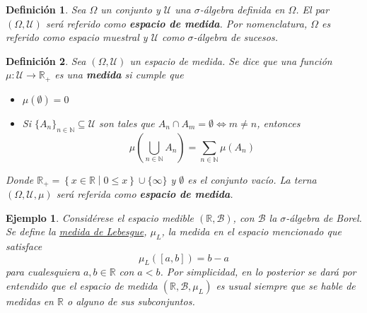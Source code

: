 \documentclass[12pt,letterpaper]{book}
\newtheorem{definicion}{Definición}[chapter]
\newtheorem{ejemplo}{Ejemplo}[chapter]
\newcommand{\R}{\mathbb{R}}
\newcommand{\talque}{\mathrel{}\middle|\mathrel{}}
\begin{document}
\begin{definicion}
Sea $\Omega$ un conjunto y $\mathcal{U}$ una $\sigma$-álgebra definida en $\Omega$. El par $(\Omega,\mathcal{U})$ será referido como \textbf{espacio de medida}. Por nomenclatura, $\Omega$ es referido como \textit{espacio muestral} y $\mathcal{U}$ como \textit{$\sigma$-álgebra de sucesos}.
\end{definicion}

\begin{definicion}%
Sea $(\Omega, \mathcal{U})$ un espacio de medida. Se dice que una función $\mu : \mathcal{U} \rightarrow \R_+$ es una \textbf{medida} si cumple que
\begin{itemize}
\item $\mu(\emptyset) = 0$
\item Si $\{ A_n \}_{n\in \mathbb{N}} \subseteq \mathcal{U}$ son tales que $A_n \cap A_m = \emptyset \Leftrightarrow m\neq n$, entonces 
\begin{equation}
\mu\left( \bigcup_{n\in \mathbb{N}} A_n \right) = \sum_{n\in \mathbb{N}} \mu(A_n)
\end{equation}
\end{itemize}
Donde $\R_+ = \left\{ x\in \R \talque 0 \leq x \right\} \cup \{ \infty \}$ y $\emptyset$ es el conjunto vacío. La terna $(\Omega,\mathcal{U},\mu)$ será referida como \textbf{espacio de medida}.
\label{medida}
\end{definicion}


\begin{ejemplo}
Considérese el espacio medible $(\R, \mathcal{B})$, con $\mathcal{B}$ la $\sigma$-álgebra de Borel. Se define la \ul{medida de Lebesgue}, $\mu_L$, la medida en el espacio mencionado que satisface 
\begin{equation}
\mu_L([a,b]) = b-a
\end{equation}
para cualesquiera $a,b \in \R$ con $a<b$. Por simplicidad, en lo posterior se dará por entendido que el espacio de medida $(\R, \mathcal{B},\mu_L)$ es \textit{usual} siempre que se hable de medidas en $\R$ o alguno de sus subconjuntos.
\end{ejemplo}
\end{document}

